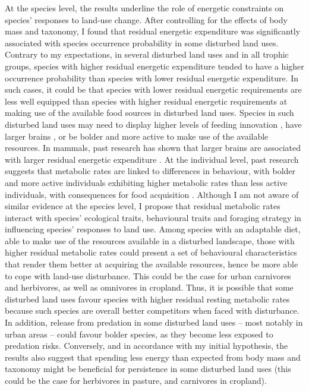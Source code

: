 At the species level, the results underline the role of energetic constraints on species' responses to land-use change. After controlling for the effects of body mass and taxonomy, I found that residual energetic expenditure was significantly associated with species occurrence probability in some disturbed land uses. Contrary to my expectations, in several disturbed land uses and in all trophic groups, species with higher residual energetic expenditure tended to have a higher occurrence probability than species with lower residual energetic expenditure. In such cases, it could be that species with lower residual energetic requirements are less well equipped than species with higher residual energetic requirements at making use of the available food sources in disturbed land uses. Species in such disturbed land uses may need to display higher levels of feeding innovation \citep{Coogan2018}, have larger brains \citep{Sayol2020}, or be bolder and more active to make use of the available resources. In mammals, past research has shown that larger brains are associated with larger residual energetic expenditure \citep{Isler2006}. At the individual level, past research suggests that metabolic rates are linked to differences in behaviour, with bolder and more active individuals exhibiting higher metabolic rates than less active individuals, with consequences for food acquisition \citep{Biro2010}. Although I am not aware of similar evidence at the species level, I propose that residual metabolic rates interact with species' ecological traits, behavioural traits and foraging strategy in influencing species' responses to land use. Among species with an adaptable diet, able to make use of the resources available in a disturbed landscape, those with higher residual metabolic rates could present a set of behavioural characteristics that render them better at acquiring the available resources, hence be more able to cope with land-use disturbance. This could be the case for urban carnivores and herbivores, as well as omnivores in cropland. Thus, it is possible that some disturbed land uses favour species with higher residual resting metabolic rates because such species are overall better competitors when faced with disturbance. In addition, release from predation in some disturbed land uses – most notably in urban areas – could favour bolder species, as they become less exposed to predation risks.
Conversely, and in accordance with my initial hypothesis, the results also suggest that spending less energy than expected from body mass and taxonomy might be beneficial for persistence in some disturbed land uses (this could be the case for herbivores in pasture, and carnivores in cropland).

